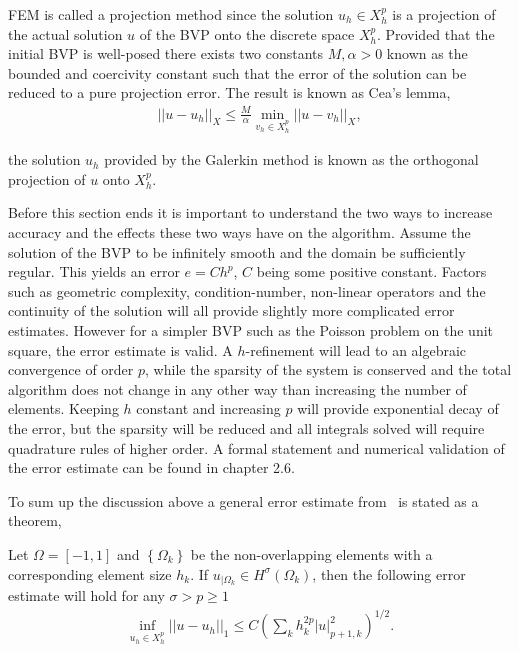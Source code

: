 FEM is called a projection method since the solution $u_h\in X_h^p$ is a projection
of the actual solution $u$ of the BVP onto the discrete space $X_h^p$. Provided that the initial BVP is well-posed there exists two 
constants $M,\alpha>0$ known as the bounded and coercivity constant such that the error of the solution can be reduced to a pure 
projection error. The result is known as Cea's lemma,  
\begin{align}
    ||u-u_h||_X \leq \frac{M}{\alpha}\min_{v_h\in X_h^p}||u-v_h||_X,
    \label{eq:Cea}
\end{align}

the solution $u_h$ provided by the Galerkin method is known as the orthogonal projection of $u$ onto $X_h^p$. 

Before this section ends it is important to understand the two ways to increase accuracy and the effects these two ways have on the algorithm. 
Assume the solution of the BVP to be infinitely smooth and the domain be sufficiently regular. 
This yields an error $e = Ch^p$, $C$ being some positive constant.
Factors such as geometric complexity, condition-number, non-linear operators and the continuity of the 
solution will all provide slightly more complicated error estimates. 
However for a simpler BVP such as the Poisson problem on the unit square, the error estimate is valid.  
A $h$-refinement will lead to an algebraic convergence of order $p$, while the sparsity of the system is conserved
and the total algorithm does not change in any other way than increasing the number of elements.
Keeping $h$ constant and increasing $p$ will provide exponential decay of the error, but the sparsity will be reduced and all integrals solved will require 
quadrature rules of higher order. A formal statement and numerical validation of the error estimate can be found in \cite{Karniadakis} chapter 2.6.  

To sum up the discussion above a general error estimate from~\cite{Quarteroni} is stated as a theorem, 
\begin{theorem}
    Let $\Omega = [-1,1]$ and $\left\{ \Omega_k \right\}$ 
    be the non-overlapping elements with a corresponding element size $h_k$.
    If $u_{|\Omega_k} \in H^{\sigma}(\Omega_k)$, 
    then the following error estimate will hold for any $ \sigma > p \ge 1$ 
\begin{align}
    \inf_{u_h \in X_h^p} ||u-u_h||_1 \le C\left( \sum_{k} h_k^{2p}|u|^2_{p+1,k} \right)^{1/2}.
\end{align}
    \label{thm:femconvergence}
\end{theorem}
%

